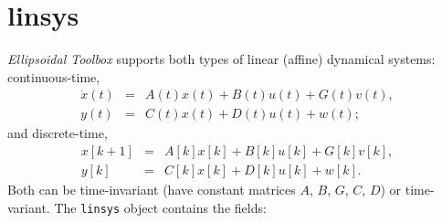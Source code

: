 \section{linsys}
{\it Ellipsoidal Toolbox}  supports both types of linear (affine)
dynamical systems: continuous-time,
\begin{eqnarray*}
\dot{x}(t) & = & A(t)x(t) + B(t)u(t) + G(t)v(t),\\
y(t) & = & C(t)x(t) + D(t)u(t) + w(t);
\end{eqnarray*}
and discrete-time,
\begin{eqnarray*}
x[k+1] & = & A[k]x[k] + B[k]u[k] + G[k]v[k], \\
y[k] & = & C[k]x[k] + D[k]u[k] + w[k].
\end{eqnarray*}
Both can be time-invariant (have constant matrices $A$, $B$, $G$, $C$, $D$)
or time-variant.
\newline
The {\tt linsys} object contains the fields:
